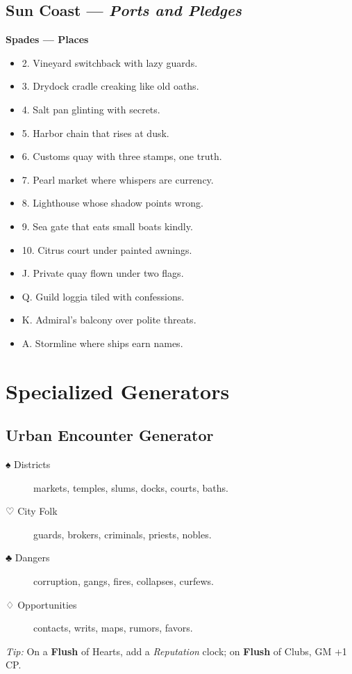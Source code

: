 \begin{multicols}{2}
\subsection*{Sun Coast — \textit{Ports and Pledges}}
\textbf{Spades — Places}
\begin{itemize}
  \item 2. Vineyard switchback with lazy guards.
  \item 3. Drydock cradle creaking like old oaths.
  \item 4. Salt pan glinting with secrets.
  \item 5. Harbor chain that rises at dusk.
  \item 6. Customs quay with three stamps, one truth.
  \item 7. Pearl market where whispers are currency.
  \item 8. Lighthouse whose shadow points wrong.
  \item 9. Sea gate that eats small boats kindly.
  \item 10. Citrus court under painted awnings.
  \item J. Private quay flown under two flags.
  \item Q. Guild loggia tiled with confessions.
  \item K. Admiral’s balcony over polite threats.
  \item A. Stormline where ships earn names.
\end{itemize}

\section{Specialized Generators}

\subsection*{Urban Encounter Generator}
\begin{description}
  \item[♠ Districts] markets, temples, slums, docks, courts, baths.
  \item[♡ City Folk] guards, brokers, criminals, priests, nobles.
  \item[♣ Dangers] corruption, gangs, fires, collapses, curfews.
  \item[♢ Opportunities] contacts, writs, maps, rumors, favors.
\end{description}
\emph{Tip:} On a \textbf{Flush} of Hearts, add a \emph{Reputation} clock; on \textbf{Flush} of Clubs, GM +1 CP.


\end{multicols}
